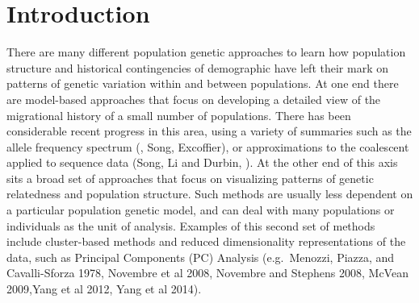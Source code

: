 \documentclass[12pt]{article}
\begin{document}
\section*{Introduction}
There are many different population genetic approaches to learn how
population structure and historical contingencies of demographic 
have left their mark on patterns of genetic variation within and between populations. 
At one end there are model-based approaches that focus on developing a detailed view of the migrational history of a small number of populations. There has been considerable recent progress in this area, using a variety of summaries such as the allele frequency spectrum (\citep{dadi}, Song, Excoffier), or approximations to the coalescent applied to sequence data (Song, Li and Durbin,  ). At the other end of this axis sits a broad set of approaches that focus on visualizing patterns of genetic relatedness and population structure. Such methods are usually less dependent on a particular population genetic model, and can deal with many populations or individuals as the unit of analysis. Examples of this second set of methods include cluster-based methods \citep{STRUCTURE, ADMIXTURE, FINESTRUCTURE} and reduced dimensionality representations of the data, such as Principal Components (PC) Analysis (e.g.\ Menozzi, Piazza, and Cavalli-Sforza 1978, Novembre et al 2008, Novembre and Stephens 2008, McVean 2009,Yang et al 2012, Yang et al 2014).
\end{document}

